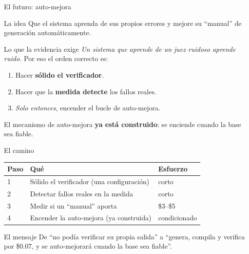 \documentclass[aspectratio=169,11pt]{beamer}
\begin{document}
\begin{frame}{El futuro: auto-mejora}
  \begin{block}{La idea}
    Que el sistema aprenda de sus propios errores y mejore su ``manual'' de
    generación automáticamente.
  \end{block}
  \begin{alertblock}{Lo que la evidencia exige}
    \emph{Un sistema que aprende de un juez ruidoso aprende ruido.} Por eso el orden
    correcto es:
  \end{alertblock}
  \begin{enumerate}
    \item Hacer \textbf{sólido el verificador}.
    \item Hacer que la \textbf{medida detecte} los fallos reales.
    \item \emph{Solo entonces}, encender el bucle de auto-mejora.
  \end{enumerate}
  El mecanismo de auto-mejora \textbf{ya está construido}; se enciende cuando la base
  sea fiable.
\end{frame}

\begin{frame}{El camino}
  \begin{center}
    \begin{tabular}{lll}
      \toprule
      \textbf{Paso} & \textbf{Qué} & \textbf{Esfuerzo} \\
      \midrule
      1 & Sólido el verificador (una configuración) & corto \\
      2 & Detectar fallos reales en la medida & corto \\
      3 & Medir si un ``manual'' aporta & \$3--\$5 \\
      4 & Encender la auto-mejora (ya construida) & condicionado \\
      \bottomrule
    \end{tabular}
  \end{center}
  \begin{block}{El mensaje}
    De ``no podía verificar su propia salida'' a ``genera, compila y verifica por
    \$0.07, y se auto-mejorará cuando la base sea fiable''.
  \end{block}
\end{frame}
\end{document}
